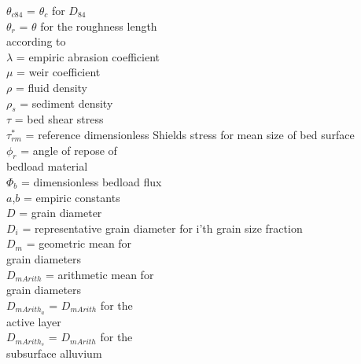 \documentclass[11pt,a4paper]{article}
\begin{document}
\begin{multicols}{2}
$\theta_{c84}$ = $\theta_c$ for $D_{84}$ \vspace{1.5ex} \\
$\theta_r$ = $\theta$ for the roughness length\\according to \citet{Julien+2013} \vspace{1.5ex} \\
$\lambda$ = empiric abrasion coefficient \vspace{1.5ex} \\
$\mu$ = weir coefficient \vspace{1.5ex} \\
$\rho$ = fluid density \vspace{1.5ex} \\
$\rho_s$ = sediment density \vspace{1.5ex} \\
$\tau$ = bed shear stress \vspace{1.5ex} \\
$\tau^\ast_{rm}$ = reference dimensionless Shields stress for mean size of bed surface \vspace{1.5ex} \\
$\phi_r$ = angle of repose of\\bedload material \vspace{1.5ex} \\
$\Phi_b$ = dimensionless bedload flux \vspace{1.5ex} \\
$a$,$b$ = empiric constants \vspace{1.5ex} \\
$D$ = grain diameter \vspace{1.5ex} \\
$D_i$ = representative grain diameter for i'th grain size fraction \vspace{1.5ex} \\
$D_m$ = geometric mean for\\grain diameters \vspace{1.5ex} \\
$D_{mArith}$ = arithmetic mean for\\grain diameters \vspace{1.5ex} \\
$D_{mArith_a}$ = $D_{mArith}$ for the\\active layer \vspace{1.5ex} \\
$D_{mArith_s}$ = $D_{mArith}$ for the\\subsurface alluvium \vspace{1.5ex} \\

\end{multicols}
\end{document}
